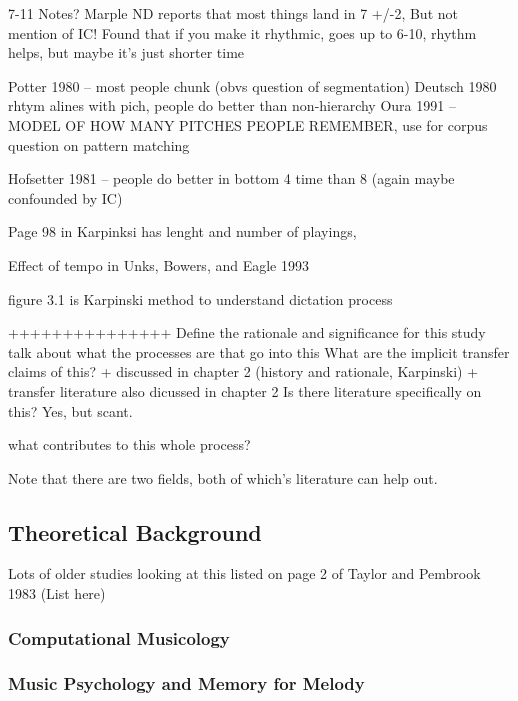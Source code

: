 \documentclass[]{book}
\theoremstyle{definition}
\theoremstyle{definition}
\theoremstyle{definition}
\theoremstyle{remark}
\begin{document}
7-11 Notes? Marple ND reports that most things land in 7 +/-2, But not
mention of IC! Found that if you make it rhythmic, goes up to 6-10,
rhythm helps, but maybe it's just shorter time

Potter 1980 -- most people chunk (obvs question of segmentation) Deutsch
1980 rhtym alines with pich, people do better than non-hierarchy Oura
1991 -- MODEL OF HOW MANY PITCHES PEOPLE REMEMBER, use for corpus
question on pattern matching

Hofsetter 1981 -- people do better in bottom 4 time than 8 (again maybe
confounded by IC)

Page 98 in Karpinksi has lenght and number of playings,

Effect of tempo in Unks, Bowers, and Eagle 1993

figure 3.1 is Karpinski method to understand dictation process

+++++++++++++++ Define the rationale and significance for this study
talk about what the processes are that go into this What are the
implicit transfer claims of this? + discussed in chapter 2 (history and
rationale, Karpinski) + transfer literature also dicussed in chapter 2
Is there literature specifically on this? Yes, but scant.

what contributes to this whole process?

Note that there are two fields, both of which's literature can help out.

\hypertarget{theoretical-background}{%
\subsection{Theoretical Background}\label{theoretical-background}}

Lots of older studies looking at this listed on page 2 of Taylor and
Pembrook 1983 (List here)

\hypertarget{computational-musicology}{%
\subsubsection{Computational
Musicology}\label{computational-musicology}}

\hypertarget{music-psychology-and-memory-for-melody}{%
\subsubsection{Music Psychology and Memory for
Melody}\label{music-psychology-and-memory-for-melody}}
\end{document}
